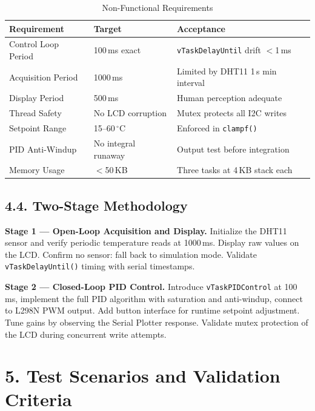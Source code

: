 \documentclass[12pt]{article}
\begin{document}
\begin{table}[H]
    \centering
    \caption{Non-Functional Requirements}
    \begin{tabular}{|l|l|l|}
        \hline
        \textbf{Requirement} & \textbf{Target} & \textbf{Acceptance} \\
        \hline
        Control Loop Period & 100\,ms exact & \texttt{vTaskDelayUntil} drift $<$1\,ms \\
        \hline
        Acquisition Period & 1000\,ms & Limited by DHT11 1\,s min interval \\
        \hline
        Display Period & 500\,ms & Human perception adequate \\
        \hline
        Thread Safety & No LCD corruption & Mutex protects all I2C writes \\
        \hline
        Setpoint Range & 15--60\,$^\circ$C & Enforced in \texttt{clampf()} \\
        \hline
        PID Anti-Windup & No integral runaway & Output test before integration \\
        \hline
        Memory Usage & $<$50\,KB & Three tasks at 4\,KB stack each \\
        \hline
    \end{tabular}
\end{table}

\subsection*{4.4. Two-Stage Methodology}

\textbf{Stage 1 --- Open-Loop Acquisition and Display.}
Initialize the DHT11 sensor and verify periodic temperature reads at 1000\,ms. Display raw values on
the LCD. Confirm no sensor: fall back to simulation mode. Validate \texttt{vTaskDelayUntil()} timing
with serial timestamps.

\textbf{Stage 2 --- Closed-Loop PID Control.}
Introduce \texttt{vTaskPIDControl} at 100\,ms, implement the full PID algorithm with saturation and
anti-windup, connect to L298N PWM output. Add button interface for runtime setpoint adjustment. Tune
gains by observing the Serial Plotter response. Validate mutex protection of the LCD during concurrent
write attempts.

\section*{5. Test Scenarios and Validation Criteria}
\end{document}
